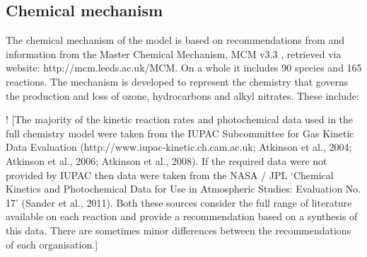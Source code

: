\documentclass[11pt,a4paper]{article}
\begin{document}
\subsection{Chemical mechanism}\label{sec:chem_mech}
The chemical mechanism of the model is based on recommendations from \citep{Atkinson2004} and information from the Master Chemical Mechanism, MCM v3.3 \citep{Jenkin1997,Saunders2003}, retrieved via website: http://mcm.leeds.ac.uk/MCM. On a whole it includes 90 species and 165 reactions. The mechanism is developed to represent the chemistry that governs the production and loss of ozone, hydrocarbons and alkyl nitrates. These include:

! \citep{Newland2013}
[The majority of the kinetic reaction rates and photochemical data used in the full chemistry model were taken from the IUPAC Subcommittee for Gas Kinetic Data Evaluation (http://www.iupac-kinetic.ch.cam.ac.uk; Atkinson et al., 2004; Atkinson et al., 2006; Atkinson et al., 2008). If the required data were not provided by IUPAC then data were taken from the NASA / JPL ‘Chemical Kinetics and Photochemical Data for Use in Atmospheric Studies: Evaluation No. 17’ (Sander et al., 2011). Both these sources consider the full range of literature available on each reaction and provide a recommendation based on a synthesis of this data. There are sometimes minor differences between the recommendations of each organisation.]
\end{document}
